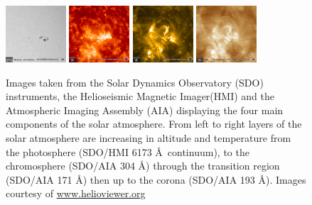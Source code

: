 \begin{figure}[H]%
  \begin{center}
  \includegraphics[width=0.20\textwidth]{2014_03_29_17_19_42_HMI_Int}%
  \includegraphics[width=0.20\textwidth]{2014_03_29_17_19_42_AIA_304}%
  \includegraphics[width=0.20\textwidth]{2014_03_29_17_19_42_AIA_171}%
  \includegraphics[width=0.20\textwidth]{2014_03_29_17_19_42_AIA_193}%
  \caption{ Images taken from the Solar Dynamics Observatory (SDO) instruments, the Helioseismic Magnetic Imager(HMI) and the Atmospheric Imaging Assembly (AIA) displaying the four main components of the solar atmosphere. From left to right layers of the solar atmosphere are increasing in altitude and temperature from the photosphere (SDO/HMI 6173 \AA\ continuum), to the chromosphere (SDO/AIA 304 \AA) through the transition region (SDO/AIA 171 \AA) then up to the corona (SDO/AIA 193 \AA). Images courtesy of \href{www.helioviewer.org}{www.helioviewer.org}}\label{solatmpics}
\end{center}
\end{figure}


